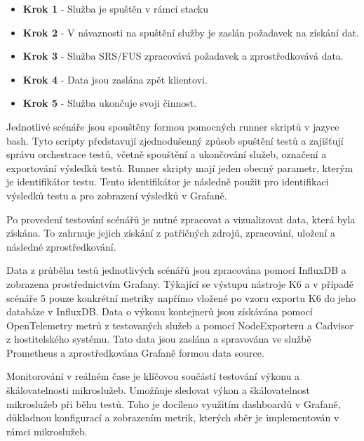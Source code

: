 
\begin{itemize}
    \item \textbf{Krok 1} - Služba je spuštěn v rámci stacku
    \item \textbf{Krok 2} - V návaznosti na spuštění služby je zaslán požadavek na získání dat.
    \item \textbf{Krok 3} - Služba SRS/FUS zpracovává požadavek a zprostředkovává data.
    \item \textbf{Krok 4} - Data jsou zaslána zpět klientovi.
    \item \textbf{Krok 5} - Služba ukončuje svoji činnost.
\end{itemize}


Jednotlivé scénáře jsou spouštěny formou pomocných runner skriptů v jazyce bash. Tyto scripty představují zjednodušenný způsob spuštění testů a zajišťují správu orchestrace testů, včetně spouštění a ukončování služeb, označení a exportování výsledků testů. Runner skripty mají jeden obecný parametr, kterým je identifikátor testu. Tento identifikátor je následně použit pro identifikaci výsledků testu a pro zobrazení výsledků v Grafaně.


Po provedení testování scénářů je nutné zpracovat a vizualizovat data, která byla získána. To zahrnuje jejich získání z patřičných zdrojů, zpracování, uložení a následné zprostředkování.


Data z průběhu testů jednotlivých scénářů jsou zpracována pomocí InfluxDB a zobrazena prostřednictvím Grafany. Týkající se výstupu nástroje K6 a v případě scénáře 5 pouze konkrétní metriky napřímo vložené po vzoru exportu K6 do jeho databáze v InfluxDB. Data o výkonu kontejnerů jsou získávána pomocí OpenTelemetry metrů z testovaných služeb a pomocí NodeExporteru a Cadvisor z hostitelského systému. Tato data jsou zaslána a spravována ve službě Prometheus a zprostředkována Grafaně formou data source.


Monitorování v reálném čase je klíčovou součástí testování výkonu a škálovatelnosti mikroslužeb. Umožňuje sledovat výkon a škálovatelnost mikroslužeb při běhu testů. Toho je docíleno využitím dashboardů v Grafaně, důkladnou konfigurací a zobrazením metrik, kterých sběr je implementován v rámci mikroslužeb.

